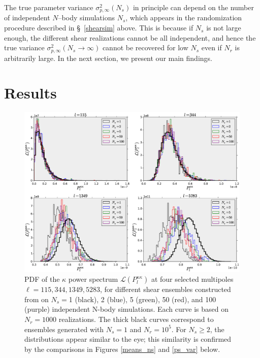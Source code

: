 \documentclass[reprint,aps,prd,superscriptaddress,showkeys,showpacs]{revtex4-1}
\begin{document}
The true parameter variance $\sigma^2_{p,\infty}(N_s)$ in principle
can depend on the number of independent $N$--body simulations $N_s$,
which appears in the randomization procedure described in
\S~\ref{shearsim} above. This is because if $N_s$ is not large enough,
the different shear realizations cannot be all independent, and hence
the true variance $\sigma^2_{p,\infty}(N_s\rightarrow\infty)$ cannot
be recovered for low $N_s$ even if $N_r$ is arbitrarily large. In the
next section, we present our main findings.
 


\section{Results} 


\begin{figure}
\includegraphics[scale=0.4]{Figures/ps_pdf.eps}
\caption{PDF of the $\kappa$ power spectrum
  $\mathcal{L}(P_l^{\kappa\kappa})$ at four selected multipoles
  $\ell=115,344,1349,5283$, for different shear ensembles constructed
  from on $N_s=$1 (black), 2 (blue), 5 (green), 50 (red), and 100
  (purple) independent N-body simulations. Each curve is based on
  $N_r=1000$ realizations.
  The thick
  black curves correspond to ensembles generated with $N_s=1$ and
  $N_r=10^5$. For $N_s\geq2$, the distributions appear
  similar to the eye; this similarity is confirmed by the comparisons
  in Figures \ref{means_ns} and \ref{ps_var} below. }
\label{ps_pdf}
\end{figure}
\end{document}

